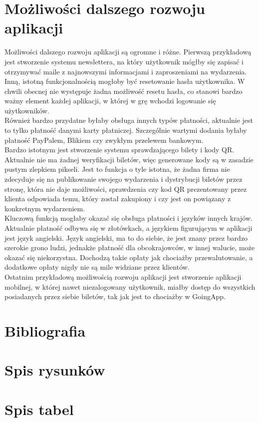 \documentclass[12pt]{article}
\begin{document}
\begin{sloppypar}
\section{Możliwości dalszego rozwoju aplikacji}
{
  Możliwości dalszego rozwoju aplikacji są ogromne i różne. 
  Pierwszą przykładową jest stworzenie systemu newslettera, na który użytkownik mógłby się zapisać i otrzymywać maile z najnowszymi informacjami i zaproszeniami na wydarzenia.\\ 
  Inną, istotną funkcjonalnością mogłoby być resetowanie hasła użytkownika. W chwili obecnej nie występuje żadna możliwość resetu hasła, co stanowi bardzo ważny element 
  każdej aplikacji, w której w grę wchodzi logowanie się użytkowników.\\
  Również bardzo przydatne byłaby obsługa innych typów płatności, aktualnie jest to tylko płatność danymi karty płatniczej. 
  Szczególnie wartymi dodania byłaby płatność PayPalem, Blikiem czy zwykłym przelewem bankowym.\\
  Bardzo istotnym jest stworzenie systemu sprawdzającego bilety i kody QR. 
  Aktualnie nie ma żadnej weryfikacji biletów, więc generowane kody są w zasadzie pustym zlepkiem pikseli. 
  Jest to funkcja o tyle istotna, że żadna firma nie zdecyduje się na publikowanie swojego wydarzenia i dystrybucji biletów przez stronę, która nie daje możliwości, 
  sprawdzenia czy kod QR prezentowany przez klienta odpowiada temu, który został zakupiony i czy jest on powiązany z konkretnym wydarzeniem.\\
  Kluczową funkcją mogłaby okazać się obsługa płatności i języków innych krajów. 
  Aktualnie płatność odbywa się w złotówkach, a językiem figurującym w aplikacji jest język angielski. 
  Język angielski, ma to do siebie, że jest znany przez bardzo szerokie grono ludzi, jednakże płatność dla obcokrajowców, w innej walucie, może okazać się niekorzystna.
  Dochodzą takie opłaty jak chociażby przewalutowanie, a dodatkowe opłaty nigdy nie są mile widziane przez klientów.\\
  Ostatnim przykładową możliwością rozwoju aplikacji jest stworzenie aplikacji mobilnej, w której nawet niezalogowany użytkownik, 
  miałby dostęp do wszystkich posiadanych przez siebie biletów, tak jak jest to chociażby w GoingApp.
}

\clearpage

\section{Bibliografia}
{
  \printbibliography
  \clearpage
}

\section{Spis rysunków}
{
  \listoffigures
  \clearpage
}

\section{Spis tabel}
{
  \listoftables
  \clearpage
}

\end{sloppypar}
\end{document}
